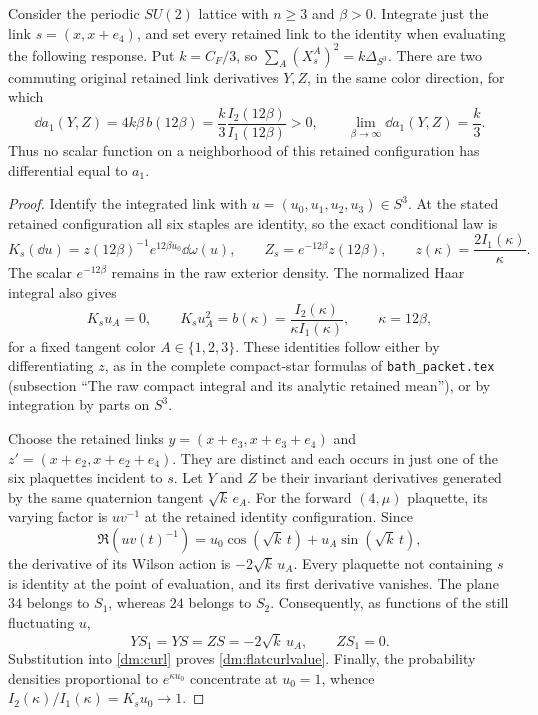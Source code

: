 \begin{proposition}
\label{dm:flatcurl}
Consider the periodic \(SU(2)\) lattice with \(n\ge3\) and \(\beta>0\). Integrate just the link \(s=(x,x+e_4)\), and set every retained link to the identity when evaluating the following response. Put \(k=C_F/3\), so \(\sum_A(X_s^A)^2=k\Delta_{S^3}\). There are two commuting original retained link derivatives \(Y,Z\), in the same color direction, for which
\begin{equation}
 \dd a_1(Y,Z)
 =4k\beta\,b(12\beta)
 =\frac{k}{3}\frac{I_2(12\beta)}{I_1(12\beta)}>0,
 \qquad
 \lim_{\beta\to\infty}\dd a_1(Y,Z)=\frac{k}{3}.
 \label{dm:flatcurlvalue}
\end{equation}
Thus no scalar function on a neighborhood of this retained configuration has differential equal to \(a_1\).
\end{proposition}
\begin{proof}
Identify the integrated link with \(u=(u_0,u_1,u_2,u_3)\in S^3\). At the stated retained configuration all six staples are identity, so the exact conditional law is
\begin{equation}
 K_s(\dd u)=z(12\beta)^{-1}e^{12\beta u_0}\dd\omega(u),\qquad
 Z_s=e^{-12\beta}z(12\beta),\qquad
 z(\kappa)=\frac{2I_1(\kappa)}{\kappa}.
 \label{dm:flatstar}
\end{equation}
The scalar \(e^{-12\beta}\) remains in the raw exterior density. The normalized Haar integral also gives
\[
 K_su_A=0,\qquad K_su_A^2=b(\kappa)
 =\frac{I_2(\kappa)}{\kappa I_1(\kappa)},\qquad \kappa=12\beta,
\]
for a fixed tangent color \(A\in\{1,2,3\}\). These identities follow either by differentiating \(z\), as in the complete compact-star formulas of \texttt{bath\_packet.tex} (subsection ``The raw compact integral and its analytic retained mean''), or by integration by parts on \(S^3\).

Choose the retained links
\(y=(x+e_3,x+e_3+e_4)\) and
\(z'=(x+e_2,x+e_2+e_4)\). They are distinct and each occurs in just one of the six plaquettes incident to \(s\). Let \(Y\) and \(Z\) be their invariant derivatives generated by the same quaternion tangent \(\sqrt{k}\,e_A\). For the forward \((4,\mu)\) plaquette, its varying factor is \(uv^{-1}\) at the retained identity configuration. Since
\[
 \Re(uv(t)^{-1})
 =u_0\cos(\sqrt{k}\,t)+u_A\sin(\sqrt{k}\,t),
\]
the derivative of its Wilson action is \(-2\sqrt{k}\,u_A\). Every plaquette not containing \(s\) is identity at the point of evaluation, and its first derivative vanishes. The plane \(34\) belongs to \(S_1\), whereas \(24\) belongs to \(S_2\). Consequently, as functions of the still fluctuating \(u\),
\[
 YS_1=YS=ZS=-2\sqrt{k}\,u_A,\qquad ZS_1=0.
\]
Substitution into \eqref{dm:curl} proves \eqref{dm:flatcurlvalue}. Finally, the probability densities proportional to \(e^{\kappa u_0}\) concentrate at \(u_0=1\), whence \(I_2(\kappa)/I_1(\kappa)=K_su_0\to1\).
\end{proof}

